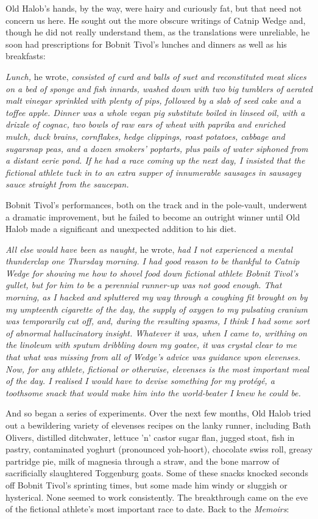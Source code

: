 Old Halob's hands, by the way, were hairy and curiously fat, but that need not concern us here. He sought out the more obscure writings of Catnip Wedge and, though he did not really understand them, as the translations were unreliable, he soon had prescriptions for Bobnit Tivol's lunches and dinners as well as his breakfasts:

\emph{Lunch,} he wrote, \emph{consisted of curd and balls of suet and reconstituted meat slices on a bed of sponge and fish innards, washed down with two big tumblers of aerated malt vinegar sprinkled with plenty of pips, followed by a slab of seed cake and a toffee apple. Dinner was a whole vegan pig substitute boiled in linseed oil, with a drizzle of cognac, two bowls of raw ears of wheat with paprika and enriched mulch, duck brains, cornflakes, hedge clippings, roast potatoes, cabbage and sugarsnap peas, and a dozen smokers' poptarts, plus pails of water siphoned from a distant eerie pond. If he had a race coming up the next day, I insisted that the fictional athlete tuck in to an extra supper of innumerable sausages in sausagey sauce straight from the saucepan.}

Bobnit Tivol's performances, both on the track and in the pole-vault, underwent a dramatic improvement, but he failed to become an outright winner until Old Halob made a significant and unexpected addition to his diet.

\emph{All else would have been as naught,} he wrote, \emph{had I not experienced a mental thunderclap one Thursday morning. I had good reason to be thankful to Catnip Wedge for showing me how to shovel food down fictional athlete Bobnit Tivol's gullet, but for him to be a perennial runner-up was not good enough. That morning, as I hacked and spluttered my way through a coughing fit brought on by my umpteenth cigarette of the day, the supply of oxygen to my pulsating cranium was temporarily cut off, and, during the resulting spasms, I think I had some sort of abnormal hallucinatory insight. Whatever it was, when I came to, writhing on the linoleum with sputum dribbling down my goatee, it was crystal clear to me that what was missing from all of Wedge's advice was guidance upon elevenses. Now, for any athlete, fictional or otherwise, elevenses is the most important meal of the day. I realised I would have to devise something for my prot\'{e}g\'{e}, a toothsome snack that would make him into the world-beater I knew he could be.}

And so began a series of experiments. Over the next few months, Old Halob tried out a bewildering variety of elevenses recipes on the lanky runner, including Bath Olivers, distilled ditchwater, lettuce 'n' castor sugar flan, jugged stoat, fish in pastry, contaminated yoghurt (pronounced yoh-hoort), chocolate swiss roll, greasy partridge pie, milk of magnesia through a straw, and the bone marrow of sacrificially slaughtered Toggenburg goats. Some of these snacks knocked seconds off Bobnit Tivol's sprinting times, but some made him windy or sluggish or hysterical. None seemed to work consistently. The breakthrough came on the eve of the fictional athlete's most important race to date. Back to the \emph{Memoirs}:

